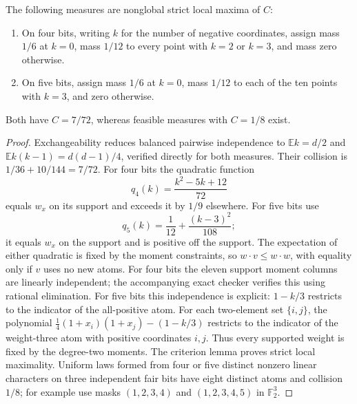 \begin{theorem}
\label{s13:thm:attainment-small-traps}
The following measures are nonglobal strict local maxima of $C$:
\begin{enumerate}
\item On four bits, writing $k$ for the number of negative coordinates,
assign mass $1/6$ at $k=0$, mass $1/12$ to every point with $k=2$ or
$k=3$, and mass zero otherwise.
\item On five bits, assign mass $1/6$ at $k=0$, mass $1/12$ to each
of the ten points with $k=3$, and zero otherwise.
\end{enumerate}
Both have $C=7/72$, whereas feasible measures with $C=1/8$ exist.
\end{theorem}
\begin{proof}
Exchangeability reduces balanced pairwise independence to
$\mathbb E k=d/2$ and $\mathbb E k(k-1)=d(d-1)/4$, verified directly
for both measures. Their collision is $1/36+10/144=7/72$.
For four bits the quadratic function
\[
 q_4(k)=\frac{k^2-5k+12}{72}
\]
equals $w_x$ on its support and exceeds it by $1/9$ elsewhere.
For five bits use
\[
 q_5(k)=\frac1{12}+\frac{(k-3)^2}{108};
\]
it equals $w_x$ on the support and is positive off the support.
The expectation of either quadratic is fixed by the moment constraints,
so $w\cdot v\le w\cdot w$, with equality only if $v$ uses no new atoms.
For four bits the eleven support moment columns are linearly independent;
the accompanying exact checker verifies this using rational elimination.
For five bits this independence is explicit: $1-k/3$ restricts to the
indicator of the all-positive atom. For each two-element set $\{i,j\}$,
the polynomial $\frac14(1+x_i)(1+x_j)-(1-k/3)$ restricts to the
indicator of the weight-three atom with positive coordinates $i,j$.
Thus every supported weight is fixed by the degree-two moments.
The criterion lemma proves strict local maximality. Uniform laws formed
from four or five distinct nonzero linear characters on three independent
fair bits have eight distinct atoms and collision $1/8$; for example
use masks $(1,2,3,4)$ and $(1,2,3,4,5)$ in $\mathbb F_2^3$.
\end{proof}

